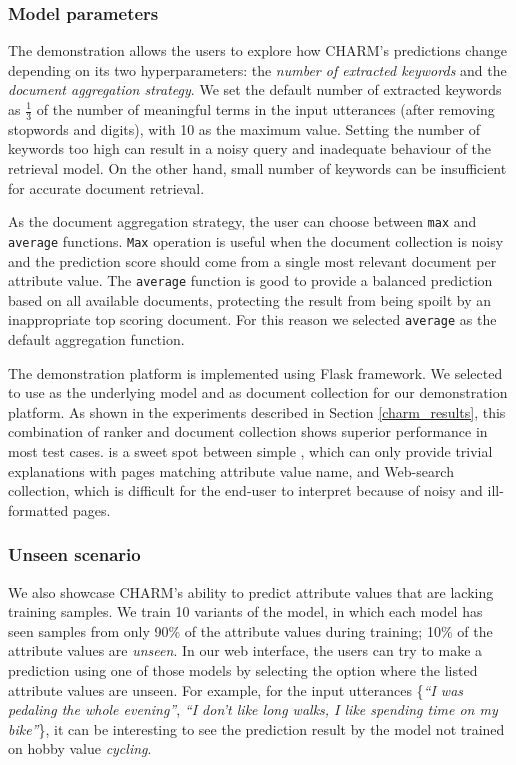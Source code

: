 \subsubsection{Model parameters} 
The demonstration allows the users to explore how CHARM's predictions change depending on its two hyperparameters: the \emph{number of extracted keywords} and the \emph{document aggregation strategy}. 
We set the default number of extracted keywords as $\frac{1}{3}$ of the number of meaningful terms in the input utterances (after removing stopwords and digits), 
with 10 as the maximum value.
Setting the number of keywords too high can result in a noisy query and inadequate behaviour of the retrieval model. 
On the other hand, small number of keywords can be insufficient for accurate document retrieval.

As the document aggregation strategy, the user can choose between \texttt{max} and \texttt{average} functions. \texttt{Max} operation is useful when the document collection is noisy and the prediction score should come from a single most relevant document per attribute value. The \texttt{average} function is good to provide a balanced prediction based on all available documents, protecting the result from being spoilt by an inappropriate top scoring document. For this reason we selected \texttt{average} as the default aggregation function.

The demonstration platform is implemented using \gls{Flask} framework. We selected to use  as the underlying model and  as document collection for our demonstration platform. As shown in the experiments described in Section \ref{charm_results}, this combination of ranker and document collection shows superior performance in most test cases.  is a sweet spot between simple , which can only provide trivial explanations with pages matching attribute value name, and Web-search collection, which is difficult for the end-user to interpret because of noisy and ill-formatted pages. %
 
\subsubsection{Unseen scenario} 
We also showcase CHARM's ability to predict attribute values
that are lacking training samples.
We train 10 variants of the model, in which each model has seen samples from only 90\% of the attribute values during training; 10\% of the attribute values are \emph{unseen}. 
In our web interface, the users can try to make a prediction using one of those models
by selecting the option where the listed attribute values are unseen. 
For example, for the input utterances \{\emph{``I was pedaling the whole evening''}, \emph{``I don't like long walks, I like spending time on my bike''}\}, it can be interesting to see the prediction result by the model not trained on hobby value \emph{cycling}. 

